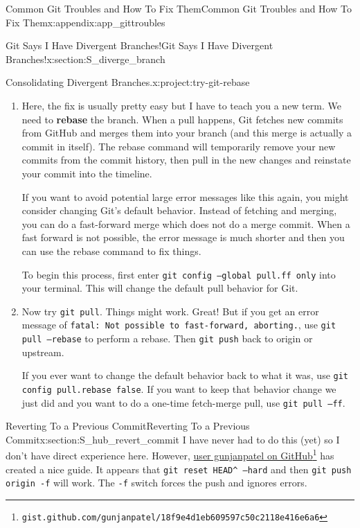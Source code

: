 \documentclass[oneside,10pt,]{book}
\newcommand{\mono}[1]{\texttt{#1}}
\newcommand{\terminology}[1]{\textbf{#1}}
\begin{document}
\begin{appendixptx}{Common Git Troubles and How To Fix Them}{}{Common Git Troubles and How To Fix Them}{}{}{x:appendix:app_gittroubles}
\begin{sectionptx}{Git Says I Have Divergent Branches!}{}{Git Says I Have Divergent Branches!}{}{}{x:section:S_diverge_branch}
\begin{project}{Consolidating Divergent Branches.}{x:project:try-git-rebase}
\begin{enumerate}[font=\bfseries,label=(\alph*),ref=\alph*]
\begin{console}{0}{1}{0}
hint: invocation.
fatal: Need to specify how to reconcile divergent branches.
\end{console}
 which is quite overwhelming.%
\item{}Here, the fix is usually pretty easy but I have to teach you a new term. We need to \terminology{rebase} the branch. When a pull happens, Git fetches new commits from GitHub and merges them into your branch (and this merge is actually a commit in itself). The rebase command will temporarily remove your new commits from the commit history, then pull in the new changes and reinstate your commit into the timeline.%
\par
If you want to avoid potential large error messages like this again, you might consider changing Git's default behavior. Instead of fetching and merging, you can do a fast-forward merge which does not do a merge commit. When a fast forward is not possible, the error message is much shorter and then you can use the rebase command to fix things.%
\par
To begin this process, first enter \mono{git config --global pull.ff only} into your terminal. This will change the default pull behavior for Git.%
\item{}Now try \mono{git pull}. Things might work. Great! But if you get an error message of \mono{fatal: Not possible to fast-forward, aborting.}, use \mono{git pull --rebase} to perform a rebase. Then \mono{git push} back to origin or upstream.%
\par
If you ever want to change the default behavior back to what it was, use \mono{git config pull.rebase false}. If you want to keep that behavior change we just did and you want to do a one-time fetch-merge pull, use \mono{git pull --ff}.%
\end{enumerate}
\end{project}%
\end{sectionptx}
%
%
\typeout{************************************************}
\typeout{************************************************}
%
\begin{sectionptx}{Reverting To a Previous Commit}{}{Reverting To a Previous Commit}{}{}{x:section:S_hub_revert_commit}
%
%
%
%
%
I have never had to do this (yet) so I don't have direct experience here. However, \href{https://gist.github.com/gunjanpatel/18f9e4d1eb609597c50c2118e416e6a6}{user gunjanpatel on GitHub}\footnote{\nolinkurl{gist.github.com/gunjanpatel/18f9e4d1eb609597c50c2118e416e6a6}\label{g:fn:idp617016120}} has created a nice guide. It appears that \mono{git reset HEAD\textasciicircum{} --hard} and then \mono{git push origin -f} will work. The \mono{-f} switch forces the push and ignores errors.%

\end{sectionptx}
\end{appendixptx}
\end{document}
